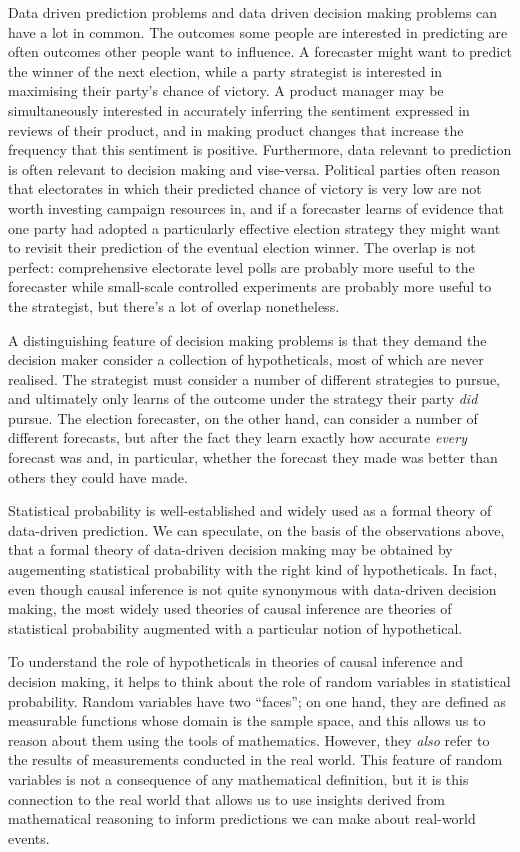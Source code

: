 Data driven prediction problems and data driven decision making problems can have a lot in common. The outcomes some people are interested in predicting are often outcomes other people want to influence. A forecaster might want to predict the winner of the next election, while a party strategist is interested in maximising their party's chance of victory. A product manager may be simultaneously interested in accurately inferring the sentiment expressed in reviews of their product, and in making product changes that increase the frequency that this sentiment is positive. Furthermore, data relevant to prediction is often relevant to decision making and vise-versa. Political parties often reason that electorates in which their predicted chance of victory is very low are not worth investing campaign resources in, and if a forecaster learns of evidence that one party had adopted a particularly effective election strategy they might want to revisit their prediction of the eventual election winner. The overlap is not perfect: comprehensive electorate level polls are probably more useful to the forecaster while small-scale controlled experiments are probably more useful to the strategist, but there's a lot of overlap nonetheless.

A distinguishing feature of decision making problems is that they demand the decision maker consider a collection of hypotheticals, most of which are never realised. The strategist must consider a number of different strategies to pursue, and ultimately only learns of the outcome under the strategy their party \emph{did} pursue. The election forecaster, on the other hand, can consider a number of different forecasts, but after the fact they learn exactly how accurate \emph{every} forecast was and, in particular, whether the forecast they made was better than others they could have made.

Statistical probability is well-established and widely used as a formal theory of data-driven prediction. We can speculate, on the basis of the observations above, that a formal theory of data-driven decision making may be obtained by augementing statistical probability with the right kind of hypotheticals. In fact, even though causal inference is not quite synonymous with data-driven decision making, the most widely used theories of causal inference are theories of statistical probability augmented with a particular notion of hypothetical.

To understand the role of hypotheticals in theories of causal inference and decision making, it helps to think about the role of random variables in statistical probability. Random variables have two ``faces''; on one hand, they are defined as measurable functions whose domain is the sample space, and this allows us to reason about them using the tools of mathematics. However, they \emph{also} refer to the results of measurements conducted in the real world. This feature of random variables is not a consequence of any mathematical definition, but it is this connection to the real world that allows us to use insights derived from mathematical reasoning to inform predictions we can make about real-world events.

